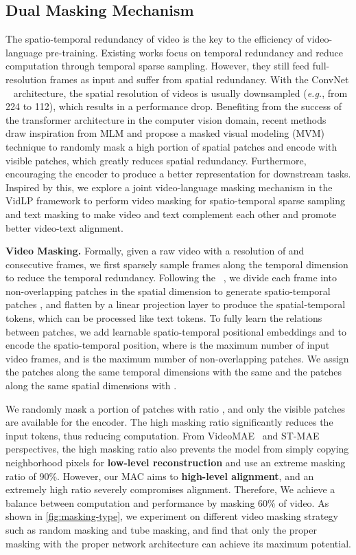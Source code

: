 \documentclass[10pt,twocolumn,letterpaper]{article}
\begin{document}
\vspace{-1mm}\subsection{Dual Masking Mechanism}\vspace{-1mm}
\label{sec:dual masking}
The spatio-temporal redundancy of video is the key to the efficiency of video-language pre-training. Existing works focus on temporal redundancy and reduce computation through temporal sparse sampling. However, they still feed full-resolution frames as input and suffer from spatial redundancy. With the ConvNet ~\cite{vgg, resnet} architecture, the spatial resolution of videos is usually downsampled (\emph{e.g.}, from 224 to 112), which results in a performance drop. Benefiting from the success of the transformer architecture in the computer vision domain, recent methods~\cite{mae, beit} draw inspiration from MLM and propose a masked visual modeling (MVM) technique to randomly mask a high portion of spatial patches and encode with visible patches, which greatly reduces spatial redundancy. Furthermore, encouraging the encoder to produce a better representation for downstream tasks. Inspired by this, we explore a joint video-language masking mechanism in the VidLP framework to perform video masking for spatio-temporal sparse sampling and text masking to make video and text complement each other and promote better video-text alignment.

\vspace{1mm}\noindent\textbf{Video Masking.} Formally, given a raw video with a resolution of    and consecutive frames, we first sparsely sample  frames along the temporal dimension to reduce the temporal redundancy. Following the ~\cite{vit}, we divide each frame into  non-overlapping patches in the spatial dimension to generate spatio-temporal patches , and flatten by a linear projection layer to produce the spatial-temporal tokens, which can be processed like text tokens. To fully learn the relations between patches, we add learnable spatio-temporal positional embeddings  and  to encode the spatio-temporal position, where  is the maximum number of input video frames, and  is the maximum number of non-overlapping patches. We assign the patches along the same temporal dimensions with the same  and the patches along the same spatial dimensions with . 

We randomly mask a portion of patches with ratio , and only the visible patches are available for the encoder. The high masking ratio significantly reduces the input tokens, thus reducing computation. From VideoMAE~\cite{videomae} and ST-MAE~\cite{st_mae} perspectives, the high masking ratio also prevents the model from simply copying neighborhood pixels for \textbf{low-level reconstruction} and use an extreme masking ratio of 90\%. However, our MAC aims to \textbf{high-level alignment}, and an extremely high ratio severely compromises alignment. Therefore, We achieve a balance between computation and performance by masking 60\% of video. As shown in \cref{fig:masking-type}, we experiment on different video masking strategy  such as random masking and tube masking, and find that only the proper masking with the proper network architecture can achieve its maximum potential. 
\end{document}
